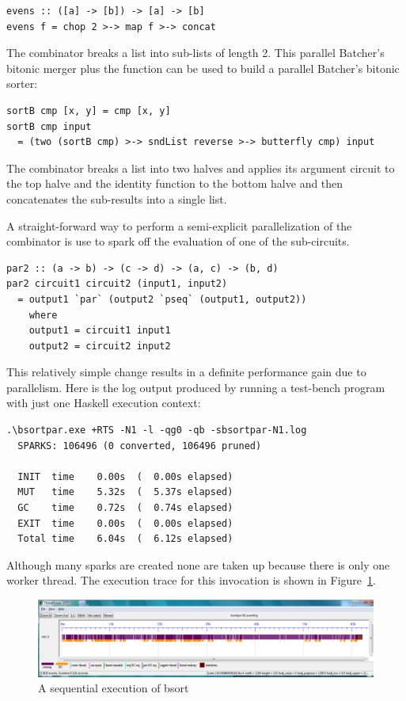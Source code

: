 \begin{lstlisting}
evens :: ([a] -> [b]) -> [a] -> [b]
evens f = chop 2 >-> map f >-> concat
\end{lstlisting}

The  combinator breaks a list into sub-lists of length 2. This parallel Batcher's bitonic merger plus the  function can be used to build a parallel Batcher's bitonic sorter:

\begin{lstlisting}
sortB cmp [x, y] = cmp [x, y]
sortB cmp input
  = (two (sortB cmp) >-> sndList reverse >-> butterfly cmp) input
\end{lstlisting}

The  combinator breaks a list into two halves and applies its argument circuit to the top halve and the identity function to the bottom halve and then concatenates the sub-results into a single list. 

A straight-forward way to perform a semi-explicit parallelization of the  combinator is use  to spark off the evaluation of one of the sub-circuits.

\begin{lstlisting}
par2 :: (a -> b) -> (c -> d) -> (a, c) -> (b, d)
par2 circuit1 circuit2 (input1, input2)
  = output1 `par` (output2 `pseq` (output1, output2))
    where
    output1 = circuit1 input1
    output2 = circuit2 input2
\end{lstlisting}

This relatively simple change results in a definite performance gain due to parallelism. Here is the log output produced by running a test-bench program with just one Haskell execution context:

\begin{verbatim}
.\bsortpar.exe +RTS -N1 -l -qg0 -qb -sbsortpar-N1.log
  SPARKS: 106496 (0 converted, 106496 pruned)

  INIT  time    0.00s  (  0.00s elapsed)
  MUT   time    5.32s  (  5.37s elapsed)
  GC    time    0.72s  (  0.74s elapsed)
  EXIT  time    0.00s  (  0.00s elapsed)
  Total time    6.04s  (  6.12s elapsed)
\end{verbatim}

Although many sparks are created none are taken up because there is only one worker thread. The execution trace for this invocation is shown in Figure~\ref{f:bsortpar-n1}.

\begin{figure}
\begin{center}
\includegraphics[width=17cm]{bsortpar-n1.png}
\end{center}
\caption{A sequential execution of bsort}
\label{f:bsortpar-n1}
\end{figure}

